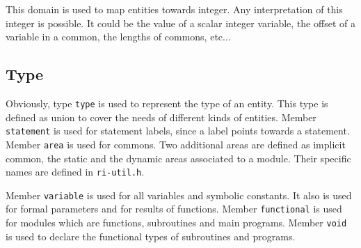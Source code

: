 \iffalse
Tout objet ayant un nom dans un programme Fortran est repre'sente' par
une \verb/entity/. Un tel objet peut e^tre un module, une variable, un
common, un ope'rateur, une constante, un label, etc. Pour chaque objet,
le sous-domaine \verb/name/ de l'entite' donne le nom de l'objet tel
qu'il apparai^t dans le texte source du programme pre'fixe' par le nom du
package dans lequel l'entite' est de'clare'e, le sous-domaine
\verb/type/ donne le type de l'entite', le sous-domaine \verb/storage/
le genre d'allocation me'moire utilise' pour l'entite', et finalement,
le sous-domaine \verb/initial/ donne la valeur initiale, si elle est
connue, de l'entite'. Le terme valeur initiale a ici un sens assez
large, puisqu'il s'agit par exemple du code pour les entite's
repre'sentant des modules.
\fi


This domain is used to map entities towards integer. Any interpretation
of this integer is possible. It could be the value of a scalar integer
variable, the offset of a variable in a common, the lengths of commons,
etc...

\subsection{Type}
\label{subsection-type}


Obviously, type {\tt type} is used to represent the type of an
entity. This type is defined as union to cover the needs of different
kinds of entities. Member {\tt statement} is used for statement
labels, since a label points towards a statement. Member
{\tt area} is used for commons. Two additional areas are
defined as implicit common, the static and the dynamic areas associated
to a module. Their specific names are defined in {\tt ri-util.h}.

Member {\tt variable} is used for all variables and symbolic
constants. It also is used for formal parameters and for results of
functions. Member {\tt functional} is used for modules which are
functions, subroutines and main programs. Member {\tt void} is used to
declare the functional types of subroutines and programs.

\iffalse
Le domaine \verb/type/ repre'sente le type d'une entite'.  Le
sous-domaine \verb/statement/ est utilise' pour les labels
d'instruction.  Le sous-domaine \verb/area/ est utilise' pour les
commons et pour les deux zones statique et dynamique associe'e a` chaque
module.  Le sous-domaine \verb/variable/ est utilise' pour toutes les
variables, y compris les parame`tres formels et le re'sultat d'une
fonction.  Le sous-domaine \verb/functional/ est utilise' pour les
fonctions, pour les subroutines et pour le programme principal.  Le
sous-domaine \verb/void/ est utilise' pour le re'sultat d'une subroutine
ou d'un programme principal.
\fi

